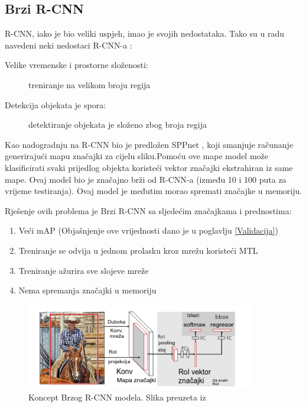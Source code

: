 \subsection{Brzi R-CNN}
R-CNN, iako je bio veliki uspjeh, imao je svojih nedostataka.
Tako su u radu \cite{DBLP:journals/corr/Girshick15} navedeni neki nedostaci R-CNN-a : 
\begin{description}
    \item [Velike vremenske i prostorne složenosti:]treniranje na velikom broju regija
    \item [Detekcija objekata je spora:]detektiranje objekata je složeno zbog broja regija
\end{description}
Kao nadogradnju na R-CNN bio je predložen SPPnet , koji smanjuje 
računanje generirajući mapu značajki za cijelu sliku.\newline Pomoću ove mape model može klasificirati svaki prijedlog objekta
koristeći vektor značajki ekstrahiran iz same mape.
Ovaj model bio je značajno brži od R-CNN-a (između 10 i 100 puta za vrijeme testiranja). Ovaj model je međutim morao spremati značajke u memoriju.\newline

Rješenje ovih problema je Brzi R-CNN sa sljedećim značajkama i prednostima:
\begin{enumerate}
    \item Veći mAP (Objašnjenje ove vrijednosti dano je u poglavlju \ref{Validacija})
    \item Treniranje se odvija u jednom prolasku kroz mrežu koristeći MTL 
    \item Treniranje ažurira sve slojeve mreže
    \item Nema spremanja značajki u memoriju
\end{enumerate}

\begin{figure}[htb]
    \centering
    \includegraphics[width=10cm]{img/Fast-RCNN.png}
    \caption{Koncept Brzog R-CNN modela. Slika preuzeta iz \citep{DBLP:journals/corr/Girshick15}}
    \label{fig:Koncept Brzog R-CNN modela}
\end{figure}

